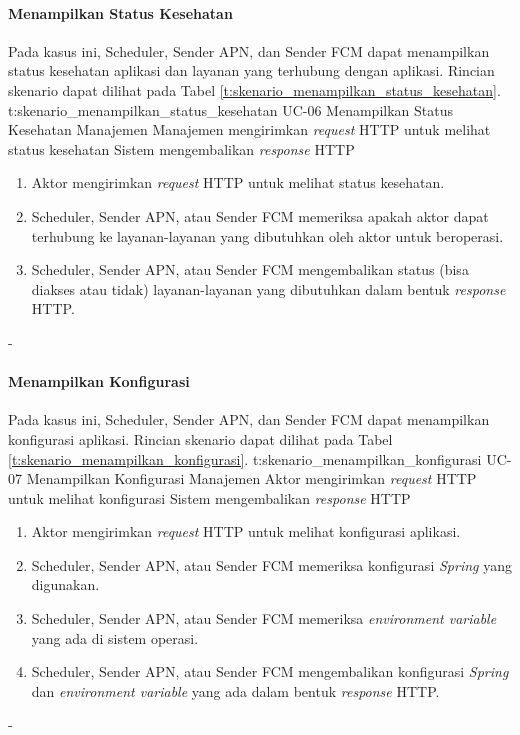 \paragraph{Menampilkan Status Kesehatan}
\par Pada kasus ini, Scheduler, Sender APN, dan Sender FCM dapat menampilkan status kesehatan aplikasi dan layanan yang terhubung dengan aplikasi. Rincian skenario dapat dilihat pada Tabel \ref{t:skenario_menampilkan_status_kesehatan}.
\tableUcDesc
{t:skenario_menampilkan_status_kesehatan}
{UC-06}
{Menampilkan Status Kesehatan}
{Manajemen}
{Manajemen mengirimkan \textit{request} HTTP untuk melihat status kesehatan}
{Sistem mengembalikan \textit{response} HTTP}
{
\begin{enumerate}
	\item Aktor mengirimkan \textit{request} HTTP untuk melihat status kesehatan.
	\item Scheduler, Sender APN, atau Sender FCM memeriksa apakah aktor dapat terhubung ke layanan-layanan yang dibutuhkan oleh aktor untuk beroperasi.
	\item Scheduler, Sender APN, atau Sender FCM mengembalikan status (bisa diakses atau tidak) layanan-layanan yang dibutuhkan dalam bentuk \textit{response} HTTP.
\end{enumerate}
}
{-}

\paragraph{Menampilkan Konfigurasi}
\par Pada kasus ini, Scheduler, Sender APN, dan Sender FCM dapat menampilkan konfigurasi aplikasi. Rincian skenario dapat dilihat pada Tabel \ref{t:skenario_menampilkan_konfigurasi}.
\tableUcDesc
{t:skenario_menampilkan_konfigurasi}
{UC-07}
{Menampilkan Konfigurasi}
{Manajemen}
{Aktor mengirimkan \textit{request} HTTP untuk melihat konfigurasi}
{Sistem mengembalikan \textit{response} HTTP}
{
	\begin{enumerate}
		\item Aktor mengirimkan \textit{request} HTTP untuk melihat konfigurasi aplikasi.
		\item Scheduler, Sender APN, atau Sender FCM memeriksa konfigurasi \textit{Spring} yang digunakan.
		\item Scheduler, Sender APN, atau Sender FCM memeriksa \textit{environment variable} yang ada di sistem operasi.
		\item Scheduler, Sender APN, atau Sender FCM mengembalikan konfigurasi \textit{Spring} dan \textit{environment variable} yang ada dalam bentuk \textit{response} HTTP.
	\end{enumerate}
}
{-}

